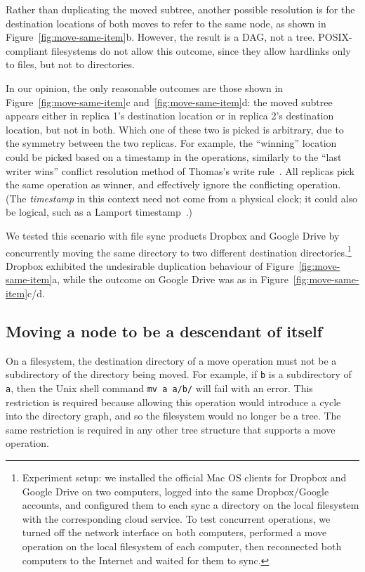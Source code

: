 \documentclass[sigconf]{acmart}
\begin{document}
Rather than duplicating the moved subtree, another possible resolution is for the destination locations of both moves to refer to the same node, as shown in Figure~\ref{fig:move-same-item}b.
However, the result is a DAG, not a tree.
POSIX-compliant filesystems do not allow this outcome, since they allow hardlinks only to files, but not to directories.

In our opinion, the only reasonable outcomes are those shown in Figure~\ref{fig:move-same-item}c and~\ref{fig:move-same-item}d: the moved subtree appears either in replica 1's destination location or in replica 2's destination location, but not in both.
Which one of these two is picked is arbitrary, due to the symmetry between the two replicas.
For example, the ``winning'' location could be picked based on a timestamp in the operations, similarly to the ``last writer wins'' conflict resolution method of Thomas's write rule~\cite{Johnson:1975we}.
All replicas pick the same operation as winner, and effectively ignore the conflicting operation.
(The \emph{timestamp} in this context need not come from a physical clock; it could also be logical, such as a Lamport timestamp~\cite{Lamport:1978jq}.)

We tested this scenario with file sync products Dropbox and Google Drive by concurrently moving the same directory to two different destination directories.\footnote{Experiment setup: we installed the official Mac OS clients for Dropbox and Google Drive on two computers, logged into the same Dropbox/Google accounts, and configured them to each sync a directory on the local filesystem with the corresponding cloud service.
To test concurrent operations, we turned off the network interface on both computers, performed a move operation on the local filesystem of each computer, then reconnected both computers to the Internet and waited for them to sync.}
Dropbox exhibited the undesirable duplication behaviour of Figure~\ref{fig:move-same-item}a, while the outcome on Google Drive was as in Figure~\ref{fig:move-same-item}c/d.

\subsection{Moving a node to be a descendant of itself}\label{sec:move-cycle}

On a filesystem, the destination directory of a move operation must not be a subdirectory of the directory being moved.
For example, if \texttt{b} is a subdirectory of \texttt{a}, then the Unix shell command \texttt{mv a a/b/} will fail with an error.
This restriction is required because allowing this operation would introduce a cycle into the directory graph, and so the filesystem would no longer be a tree.
The same restriction is required in any other tree structure that supports a move operation.
\end{document}

